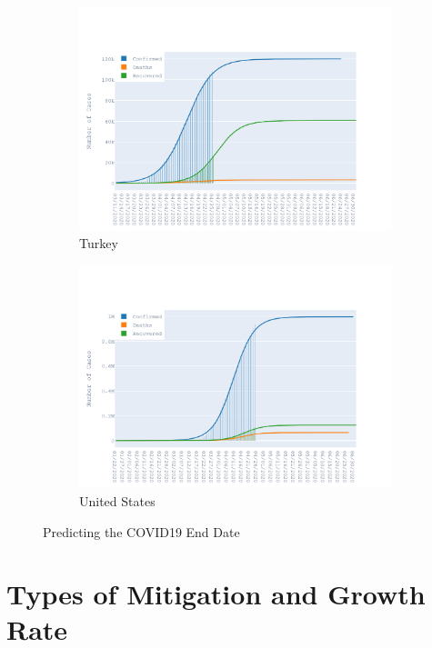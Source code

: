 \documentclass{homework}
\begin{document}
\begin{figure}[H]
  \begin{subfigure}{0.45\linewidth}
    \includegraphics[width=\linewidth]{task2/Turkey.png}
    \caption{Turkey}
  \end{subfigure}
  \hfil
  \begin{subfigure}{0.45\linewidth}
    \includegraphics[width=\linewidth]{task2/United States.png}
    \caption{United States}
  \end{subfigure}

  \caption{Predicting the COVID19 End Date}
  \label{fig:task2}
\end{figure}

\newpage
\section{Types of Mitigation and Growth Rate}
\end{document}
